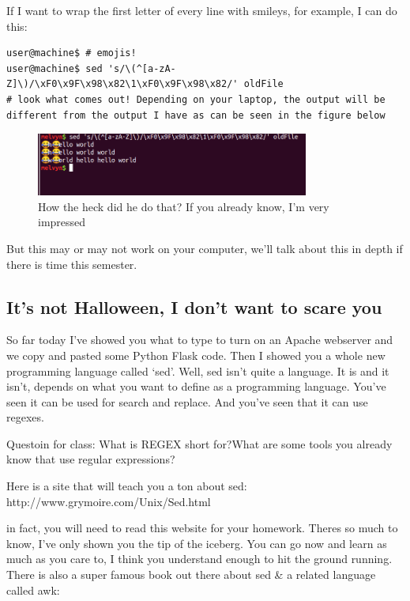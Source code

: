 \documentclass[10pt]{article}
\begin{document}
If I want to wrap the first letter of every line with smileys, for example, I can do this:

\begin{lstlisting}[style=term]
user@machine$ # emojis!
user@machine$ sed 's/\(^[a-zA-Z]\)/\xF0\x9F\x98\x82\1\xF0\x9F\x98\x82/' oldFile
# look what comes out! Depending on your laptop, the output will be different from the output I have as can be seen in the figure below
\end{lstlisting}


\begin{figure}[h]
  \centering
    \includegraphics[width=0.8\textwidth]{mayOrMayNotWorkForYou.png}
  \caption{How the heck did he do that? If you already know, I'm very impressed}
\end{figure}

But this may or may not work on your computer, we'll talk about this in depth if there is time this semester.

\subsection{It's not Halloween, I don't want to scare you}
So far today I've showed you what to type to turn on an Apache webserver and we copy and pasted some Python Flask code. Then I showed you a whole new programming language called `sed'. Well, sed isn't quite a language. It is and it isn't, depends on what you want to define as a programming language. You've seen it can be used for search and replace. And you've seen that it can use regexes.

\begin{center}
{\LARGE Questoin for class: What is REGEX short for?What are some tools you already know that use regular expressions?}
\end{center}


Here is a site that will teach you a ton about sed:
http://www.grymoire.com/Unix/Sed.html

in fact, you will need to read this website for your homework. Theres so much to know, I've only shown you the tip of the iceberg. You can go now and learn as much as you care to, I think you understand enough to hit the ground running. There is also a super famous book out there about sed \& a related language called awk:
\end{document}
